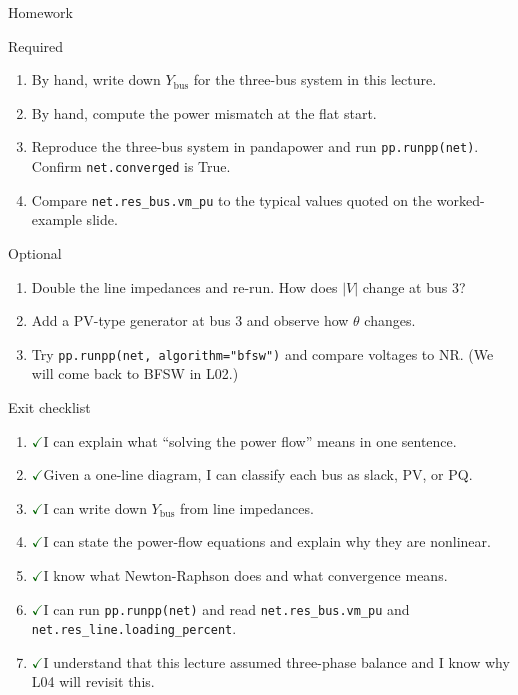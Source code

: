 \documentclass[aspectratio=169,10pt]{beamer}
\newcommand{\code}[1]{\texttt{#1}}
\newcommand{\checkitem}{\textcolor{darkgreen}{\Large$\checkmark$}\;}
\begin{document}
\begin{frame}{Homework}
\begin{block}{Required}
\begin{enumerate}
  \item By hand, write down $Y_{\text{bus}}$ for the three-bus system in this lecture.
  \item By hand, compute the power mismatch at the flat start.
  \item Reproduce the three-bus system in pandapower and run \code{pp.runpp(net)}. Confirm \code{net.converged} is True.
  \item Compare \code{net.res\_bus.vm\_pu} to the typical values quoted on the worked-example slide.
\end{enumerate}
\end{block}
\begin{block}{Optional}
\begin{enumerate}
  \item Double the line impedances and re-run. How does $|V|$ change at bus 3?
  \item Add a PV-type generator at bus 3 and observe how $\theta$ changes.
  \item Try \code{pp.runpp(net, algorithm="bfsw")} and compare voltages to NR. (We will come back to BFSW in L02.)
\end{enumerate}
\end{block}
\end{frame}

\begin{frame}{Exit checklist}
\begin{enumerate}
  \item \checkitem I can explain what ``solving the power flow'' means in one sentence.
  \item \checkitem Given a one-line diagram, I can classify each bus as slack, PV, or PQ.
  \item \checkitem I can write down $Y_{\text{bus}}$ from line impedances.
  \item \checkitem I can state the power-flow equations and explain why they are nonlinear.
  \item \checkitem I know what Newton-Raphson does and what convergence means.
  \item \checkitem I can run \code{pp.runpp(net)} and read \code{net.res\_bus.vm\_pu} and \code{net.res\_line.loading\_percent}.
  \item \checkitem I understand that this lecture assumed three-phase balance and I know why L04 will revisit this.
\end{enumerate}
\end{frame}
\end{document}
